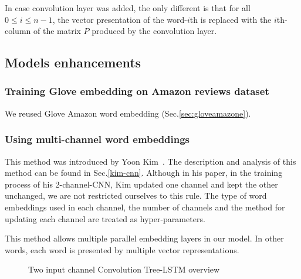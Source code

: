 In case convolution layer was added, the only different is that for all \(0 \leq i \leq n-1\), the vector presentation of the word-\({i}\)th is replaced with the \({i}\)th-column of the matrix \({P}\) produced by the convolution layer.
 

 
\subsection{Models enhancements}\label{sec:model-enhan}
\subsubsection{Training Glove embedding on Amazon reviews dataset}\label{sec:reuse-glove-amazon}
We reused Glove Amazon word embedding (Sec.\ref{sec:gloveamazone}).

\subsubsection{Using multi-channel word embeddings}\label{sec:enhan-multi-channel}
This method was introduced by Yoon Kim~\cite{KimCNN}.
The description and analysis of this method can be found in Sec.\ref{kim-cnn}.
Although in his paper, in the training process of his 2-channel-CNN, Kim updated one channel and kept the other unchanged, we are not restricted ourselves to this rule.
The type of word embeddings used in each channel, the number of channels and the method for updating each channel are treated as hyper-parameters.

This method allows multiple parallel embedding layers in our model.
In other words, each word is presented by multiple vector representations.

\begin{figure}[H]
    \centering
    \caption[Convolution Tree-LSTM overview]{Two input channel Convolution Tree-LSTM overview}
    \label{fig:multichannelcnnlstm}
\end{figure}


